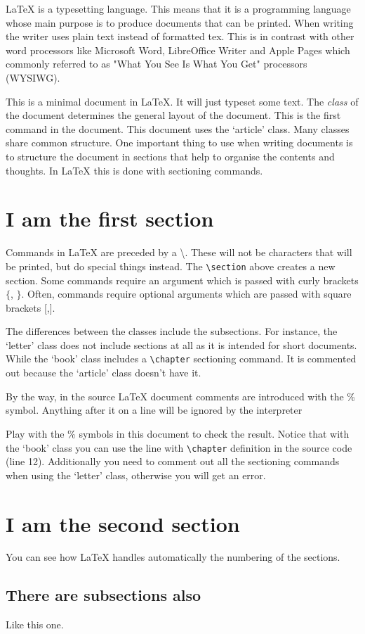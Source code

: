 \documentclass[a4paper]{article}
\begin{document}
\LaTeX{} is a typesetting language. This means that it is a programming language whose main purpose is to produce documents that can be printed. When writing the writer uses plain text instead of formatted tex. This is in contrast with other word processors like Microsoft Word,  LibreOffice Writer and Apple Pages which commonly referred to as "What You See Is What You Get" processors (WYSIWG). 

This is a minimal document in \LaTeX. It will just typeset some text. The \emph{class} of the document determines the general layout of the document. This is the first command in the document. This document uses the `article' class. Many classes share common structure. One important thing to use when writing documents is to structure the document in sections that help to organise the contents and thoughts. In \LaTeX{} this is done with sectioning commands.


\section{I am the first section}

Commands in \LaTeX{} are preceded by a \textbackslash. These will not be characters that will be printed, but do special things instead. The \texttt{\textbackslash{}section} above creates a new section. Some commands require an argument which is passed with curly brackets $\{$, $\}$. Often, commands require optional arguments which are passed with square brackets [,].

The differences between the classes include the subsections. For instance, the `letter' class does not include sections at all as it is intended for short documents. While the `book' class includes a \texttt{\textbackslash{}chapter} sectioning command. It is commented out because the `article' class doesn't have it. 

By the way, in the source \LaTeX{} document comments are introduced with the \% symbol. Anything after it on a line will be ignored by the interpreter%

Play with the \% symbols in this document to check the result. Notice that with the `book' class you can use the line with \texttt{\textbackslash{}chapter} definition in the source code (line 12). Additionally you need to comment out all the sectioning commands when using the `letter' class, otherwise you will get an error.

\section{I am the second section}

You can see how \LaTeX{} handles automatically the numbering of the sections. 

\subsection{There are subsections also}

Like this one.
\end{document}
